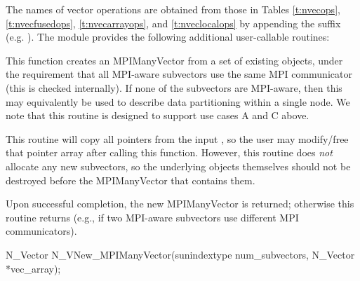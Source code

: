 The names of vector operations are obtained from those in Tables
\ref{t:nvecops}, \ref{t:nvecfusedops}, \ref{t:nvecarrayops}, and
\ref{t:nveclocalops} by appending the suffix  
(e.g. ).
The module {\nvecmpimanyvector} provides the following additional
user-callable routines:
{
  This function creates an MPIManyVector from a set of existing {\nvector}
  objects, under the requirement that all MPI-aware subvectors use the
  same MPI communicator (this is checked internally).  If none of the
  subvectors are MPI-aware, then this may equivalently be used to
  describe data partitioning within a single node.  We note that this
  routine is designed to support use cases A and C above.

  This routine will copy all  pointers from the input
  , so the user may modify/free that pointer array
  after calling this function.  However, this routine does \emph{not}
  allocate any new subvectors, so the underlying {\nvector} objects
  themselves should not be destroyed before the MPIManyVector that
  contains them.

  Upon successful completion, the new MPIManyVector is returned;
  otherwise this routine returns  (e.g., if two MPI-aware
  subvectors use different MPI communicators).
}
{
  N\_Vector N\_VNew\_MPIManyVector(sunindextype num\_subvectors,
  N\_Vector *vec\_array);
}
